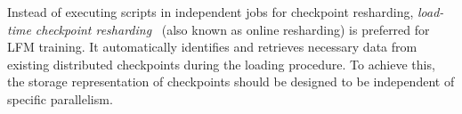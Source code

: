 
Instead of executing scripts in independent jobs for checkpoint resharding, \textit{load-time checkpoint resharding}~\cite{torch-dcp} (also known as online  resharding) is preferred for LFM training.
It automatically identifies and retrieves necessary data from existing distributed checkpoints during the loading procedure.
To achieve this, the storage representation of checkpoints should be designed to be independent of specific parallelism. 




